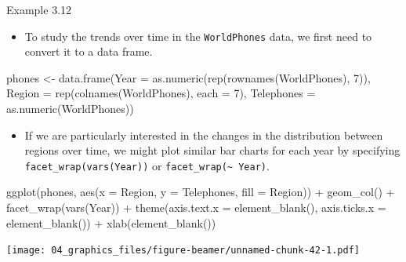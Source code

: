 \documentclass[
  9pt,
  a4paper,
  ignorenonframetext,
  notheorems]{beamer}
\newenvironment{Shaded}{\begin{snugshade}}{\end{snugshade}}
\newcommand{\AttributeTok}[1]{\textcolor[rgb]{0.40,0.45,0.13}{#1}}
\newcommand{\DecValTok}[1]{\textcolor[rgb]{0.68,0.00,0.00}{#1}}
\newcommand{\FunctionTok}[1]{\textcolor[rgb]{0.28,0.35,0.67}{#1}}
\newcommand{\NormalTok}[1]{\textcolor[rgb]{0.00,0.23,0.31}{#1}}
\newcommand{\OtherTok}[1]{\textcolor[rgb]{0.00,0.23,0.31}{#1}}
\newcommand{\SpecialCharTok}[1]{\textcolor[rgb]{0.37,0.37,0.37}{#1}}
\providecommand{\tightlist}{%
  \setlength{\itemsep}{0pt}\setlength{\parskip}{0pt}}\usepackage{longtable,booktabs,array}
\begin{document}
\begin{frame}[fragile]
\begin{block}{Example 3.12}
\protect\hypertarget{example-3.12}{}
\begin{itemize}
\tightlist
\item
  To study the trends over time in the \texttt{WorldPhones} data, we
  first need to convert it to a data frame.
\end{itemize}

\begin{Shaded}
\begin{Highlighting}[]
\NormalTok{phones }\OtherTok{\textless{}{-}} \FunctionTok{data.frame}\NormalTok{(}\AttributeTok{Year =} \FunctionTok{as.numeric}\NormalTok{(}\FunctionTok{rep}\NormalTok{(}\FunctionTok{rownames}\NormalTok{(WorldPhones), }\DecValTok{7}\NormalTok{)),}
                     \AttributeTok{Region =} \FunctionTok{rep}\NormalTok{(}\FunctionTok{colnames}\NormalTok{(WorldPhones), }\AttributeTok{each =} \DecValTok{7}\NormalTok{), }
                     \AttributeTok{Telephones =} \FunctionTok{as.numeric}\NormalTok{(WorldPhones))}
\end{Highlighting}
\end{Shaded}

\begin{itemize}
\tightlist
\item
  If we are particularly interested in the changes in the distribution
  between regions over time, we might plot similar bar charts for each
  year by specifying \texttt{facet\_wrap(vars(Year))} or
  \texttt{facet\_wrap(\textasciitilde{}\ Year)}.
\end{itemize}
\end{block}
\end{frame}

\begin{frame}[fragile]
\begin{Shaded}
\begin{Highlighting}[]
\FunctionTok{ggplot}\NormalTok{(phones, }\FunctionTok{aes}\NormalTok{(}\AttributeTok{x =}\NormalTok{ Region, }\AttributeTok{y =}\NormalTok{ Telephones, }\AttributeTok{fill =}\NormalTok{ Region)) }\SpecialCharTok{+}
  \FunctionTok{geom\_col}\NormalTok{() }\SpecialCharTok{+} \FunctionTok{facet\_wrap}\NormalTok{(}\FunctionTok{vars}\NormalTok{(Year)) }\SpecialCharTok{+}
  \FunctionTok{theme}\NormalTok{(}\AttributeTok{axis.text.x =} \FunctionTok{element\_blank}\NormalTok{(), }\AttributeTok{axis.ticks.x =} \FunctionTok{element\_blank}\NormalTok{()) }\SpecialCharTok{+}
  \FunctionTok{xlab}\NormalTok{(}\FunctionTok{element\_blank}\NormalTok{())}
\end{Highlighting}
\end{Shaded}

\texttt{[image: 04\_graphics\_files/figure-beamer/unnamed-chunk-42-1.pdf]}
\end{frame}
\end{document}
